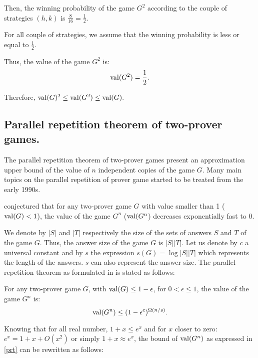 Then, the winning probability of the game $G^2$ according to the couple of strategies $(h,k)$ is $\frac{8}{16}=\frac{1}{2}.$

For all couple of strategies, we assume that the winning probability is less or equal to $\frac{1}{2}.$

Thus, the value of the game $G^2$  is: $$\mathrm{val} (G^2)=\frac{1}{2}.$$

Therefore, $\mathrm{val} (G)^2\leq \mathrm{val} (G^2) \leq \mathrm{val} (G).$



\subsection{Parallel repetition theorem of two-prover games.}

The parallel repetition theorem of  two-prover games present an  approximation upper bound of the value of $n$ independent copies of the game $G$.
Many main topics on the parallel repetition of prover game started to be treated from the early 1990s. 

\cite{feige1992two} conjectured that  for any two-prover game $G$ with value smaller than 1 ($\mathrm{val} (G)<1$), the value of the game $G^n$ ($\mathrm{val} (G^n$) decreases exponentially fast to 0.

We denote by $|S|$ and $|T|$ respectively the size of the sets of answers $S$ and $T$ of the game $G$. Thus, the  answer  size of the game $G$ is $|S||T|$.
Let us denote by $c$ a universal constant and by $s$ the expression  $s(G)=\log |S||T|$ which represents the length of the answers. $s$ can also represent the  answer size.
The parallel repetition theorem as formulated in \cite{raz1998parallel,raz2010parallel} is stated as follows:

\begin{thm} For any two-prover game $G$, with $\mathrm{val} (G) \leq 1-\epsilon$, for $0 < \epsilon \leq 1$, the value of the game $G^n$ is: $$ \mathrm{val} (G^n) \leq (1-\epsilon^c)^{\Omega(n/s)}.$$ \label{prt}    \end{thm}

Knowing that for all real number, $1+x \leq e^x$ and
for $x$ closer to zero:  $e^x = 1+x+O(x^2)$ or simply  $1+x \approx e^x$,
the bound of $\mathrm{val} (G^n)$ as expressed in \eqref{prt} can be rewritten as follows:

